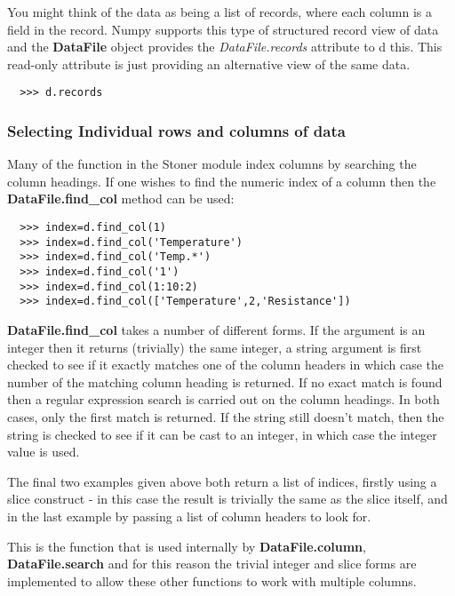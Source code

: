 \documentclass[a4paper,11pt]{scrartcl}
\begin{document}
You might think of the data as being a list of records, where each column is a
field in the record. Numpy supports this type of structured record view of data
and the \textbf{DataFile} object provides the \textit{DataFile.records}
attribute to d this. This read-only attribute is just providing an alternative
view of the same data.

\begin{verbatim}
  >>> d.records
\end{verbatim}

\subsubsection{Selecting Individual rows and columns of data}

Many of the function in the Stoner module index columns by searching the column
headings. If one wishes to find the numeric index of a column then the
\textbf{DataFile.find\_col} method can be used:

\begin{verbatim}
  >>> index=d.find_col(1)
  >>> index=d.find_col('Temperature')
  >>> index=d.find_col('Temp.*')
  >>> index=d.find_col('1')
  >>> index=d.find_col(1:10:2)
  >>> index=d.find_col(['Temperature',2,'Resistance'])
\end{verbatim}

 \textbf{DataFile.find\_col} takes a number of different forms. If the argument
is an integer then it returns (trivially) the same integer, a string argument is
first checked to see if it exactly matches one of the column headers in which
case the number of the matching column heading is returned. If no exact match is
found then a regular expression search is carried out on the column headings. In
both cases, only the first match is returned. If the string still doesn't match, then
the string is checked to see if it can be cast to an integer, in which case the integer value is used.

The final two examples given above
both return a list of indices, firstly using a slice construct - in this case
the result is trivially the same as the slice itself, and in the last example by
passing a list of column headers to look for.

This is the function that is used internally by \textbf{DataFile.column},
\textbf{DataFile.search} \etc and for this reason the trivial integer and slice
forms are implemented to allow these other functions to work with multiple
columns.
\end{document}
